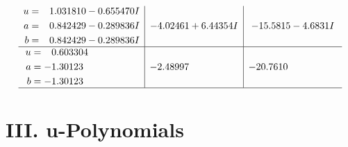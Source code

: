 \documentclass[1p]{elsarticle_modified}
\theoremstyle{definition}
\begin{document}
$$\begin{array}{c|c|c}
\begin{aligned}
u &= \phantom{-}1.031810 - 0.655470 I \\
a &= \phantom{-}0.842429 - 0.289836 I \\
b &= \phantom{-}0.842429 - 0.289836 I\end{aligned}
 & -4.02461 + 6.44354 I & -15.5815 - 4.6831 I \\ \hline\begin{aligned}
u &= \phantom{-}0.603304\phantom{ +0.000000I} \\
a &= -1.30123\phantom{ +0.000000I} \\
b &= -1.30123\phantom{ +0.000000I}\end{aligned}
 & -2.48997\phantom{ +0.000000I} & -20.7610\phantom{ +0.000000I}\\
 \hline 
 \end{array}$$\newpage
\newpage\renewcommand{\arraystretch}{1}
\centering \section*{ III. u-Polynomials}
\end{document}
